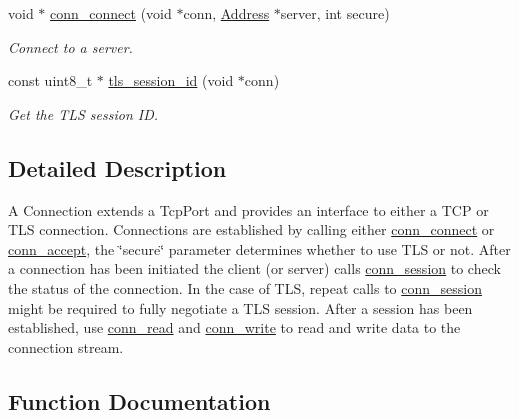 \begin{DoxyCompactItemize}
void $\ast$ \hyperlink{group__connection_ga65e5baf687f5019281338a8c57f55e64}{conn\+\_\+connect} (void $\ast$conn, \hyperlink{group__address_ga80f2dcdb3778441e85ac8c9dbb6f324a}{Address} $\ast$server, int secure)
\begin{DoxyCompactList}\small\item\em Connect to a server. \end{DoxyCompactList}\item 
const uint8\+\_\+t $\ast$ \hyperlink{group__connection_ga472e20ef3d5e6f8800959c8b4f9c757b}{tls\+\_\+session\+\_\+id} (void $\ast$conn)
\begin{DoxyCompactList}\small\item\em Get the T\+LS session ID. \end{DoxyCompactList}\end{DoxyCompactItemize}


\subsection{Detailed Description}
A Connection extends a Tcp\+Port and provides an interface to either a T\+CP or T\+LS connection. Connections are established by calling either \hyperlink{group__connection_ga65e5baf687f5019281338a8c57f55e64}{conn\+\_\+connect} or \hyperlink{group__connection_gaa06e12daa8e40fc9090823e03283a3d6}{conn\+\_\+accept}, the \char`\"{}secure\char`\"{} parameter determines whether to use T\+LS or not. After a connection has been initiated the client (or server) calls \hyperlink{group__connection_ga2235487c1e762621555875579dc10fea}{conn\+\_\+session} to check the status of the connection. In the case of T\+LS, repeat calls to \hyperlink{group__connection_ga2235487c1e762621555875579dc10fea}{conn\+\_\+session} might be required to fully negotiate a T\+LS session. After a session has been established, use \hyperlink{group__connection_ga8b841fbab5b0a476ce2d8bf8a05ecbcd}{conn\+\_\+read} and \hyperlink{group__connection_gae63df32b30da421837e2c67cfacc3497}{conn\+\_\+write} to read and write data to the connection stream. 

\subsection{Function Documentation}
\mbox{\label{group__connection_gaa06e12daa8e40fc9090823e03283a3d6}} 
